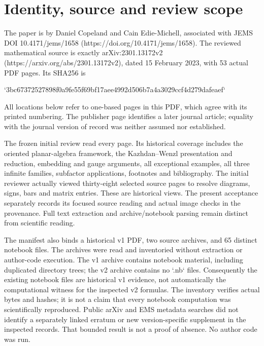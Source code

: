 \documentclass[10pt]{article}
\begin{document}
\section*{Identity, source and review scope}
The paper is by Daniel Copeland and Cain Edie-Michell, associated with JEMS DOI 10.4171/jems/1658 (https://doi.org/10.4171/jems/1658). The reviewed mathematical source is exactly arXiv:2301.13172v2 (https://arxiv.org/abs/2301.13172v2), dated 15 February 2023, with 53 actual PDF pages. Its SHA256 is\par
`3bc67372527898f0a9fe55f69bf17aee4992d506b7a4a3029ccf4d279dafeaef`\par
All locations below refer to one-based pages in this PDF, which agree with its printed numbering. The publisher page identifies a later journal article; equality with the journal version of record was neither assumed nor established.\par
The frozen initial review read every page. Its historical coverage includes the oriented planar-algebra framework, the Kazhdan–Wenzl presentation and reduction, embedding and gauge arguments, all exceptional examples, all three infinite families, subfactor applications, footnotes and bibliography. The initial reviewer actually viewed thirty-eight selected source pages to resolve diagrams, signs, bars and matrix entries. These are historical views. The present acceptance separately records its focused source reading and actual image checks in the provenance. Full text extraction and archive/notebook parsing remain distinct from scientific reading.\par
The manifest also binds a historical v1 PDF, two source archives, and 65 distinct notebook files. The archives were read and inventoried without extraction or author-code execution. The v1 archive contains notebook material, including duplicated directory trees; the v2 archive contains no `.nb` files. Consequently the existing notebook files are historical v1 evidence, not automatically the computational witness for the inspected v2 formulas. The inventory verifies actual bytes and hashes; it is not a claim that every notebook computation was scientifically reproduced. Public arXiv and EMS metadata searches did not identify a separately linked erratum or new version-specific supplement in the inspected records. That bounded result is not a proof of absence. No author code was run.\par
\end{document}
